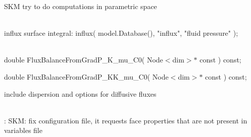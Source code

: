 \begin{DoxyRefList}
SKM try to do computations in parametric space 
\item[Member \doxylink{classcsmp_1_1_finite_volume_stencil_speed___test_a54ed2cc3436766235e63a622e10e5013}{csmp\+::Finite\+Volume\+Stencil\+Speed\+\_\+\+Test\+::Divergence\+Free\+Total\+Velocity\+Field} (\doxylink{classcsmp_1_1_model}{Model$<$ 3\+U $>$} \&, double delta\+\_\+pf)]\hfill \\
\label{todo__todo000260}%
%
influx surface integral\+:  influx( model.\+Database(), "{}influx"{}, "{}fluid pressure"{} );  
\item[Class \doxylink{classcsmp_1_1_flux_evaluator}{csmp\+::Flux\+Evaluator\texorpdfstring{$<$}{<} dim, USER \texorpdfstring{$>$}{>}} ]\hfill \\
\label{todo__todo000092}%
%
double Flux\+Balance\+From\+Grad\+P\+\_\+\+K\+\_\+mu\+\_\+\+C0( Node$<$dim$>$\texorpdfstring{$\ast$}{*} const ) const; 



double Flux\+Balance\+From\+Grad\+P\+\_\+\+KK\+\_\+mu\+\_\+\+C0( Node$<$dim$>$\texorpdfstring{$\ast$}{*} const ) const; 



include dispersion and options for diffusive fluxes 
\item[Member \doxylink{classcsmp_1_1_geothermal___example_a1904bcf573f482b7d9ec4c7057ad6eef}{csmp\+::Geothermal\+\_\+\+Example\+::Run} ()]\hfill \\
\label{todo__todo000039}%
%
\+: SKM\+: fix configuration file, it requests face properties that are not present in variables file 




\end{DoxyRefList}
